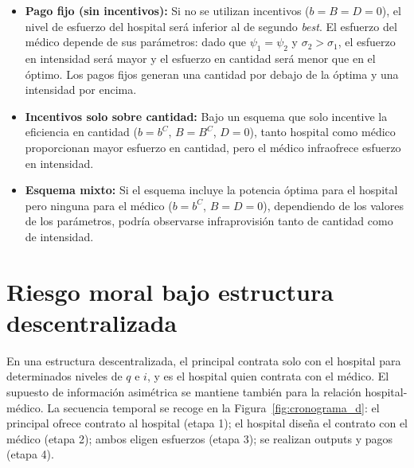 \documentclass[12pt, a4paper, twoside, openright]{book}
\theoremstyle{plain}
\theoremstyle{definition}
\theoremstyle{remark}
\begin{document}
\begin{itemize}
  \item \textbf{Pago fijo (sin incentivos):} Si no se utilizan incentivos ($b=B=D=0$), el nivel de esfuerzo del hospital será inferior al de segundo \textit{best}. El esfuerzo del médico depende de sus parámetros: dado que $\psi_1=\psi_2$ y $\sigma_2>\sigma_1$, el esfuerzo en intensidad será mayor y el esfuerzo en cantidad será menor que en el óptimo. Los pagos fijos generan una cantidad por debajo de la óptima y una intensidad por encima.

  \item \textbf{Incentivos solo sobre cantidad:} Bajo un esquema que solo incentive la eficiencia en cantidad ($b=b^C$, $B=B^C$, $D=0$), tanto hospital como médico proporcionan mayor esfuerzo en cantidad, pero el médico infraofrece esfuerzo en intensidad.

  \item \textbf{Esquema mixto:} Si el esquema incluye la potencia óptima para el hospital pero ninguna para el médico ($b=b^C$, $B=D=0$), dependiendo de los valores de los parámetros, podría observarse infraprovisión tanto de cantidad como de intensidad.
\end{itemize}


\section{Riesgo moral bajo estructura descentralizada}
\label{sec:descentralizada}

En una estructura descentralizada, el principal contrata solo con el hospital para determinados niveles de $q$ e $i$, y es el hospital quien contrata con el médico. El supuesto de información asimétrica se mantiene también para la relación hospital-médico. La secuencia temporal se recoge en la Figura~\ref{fig:cronograma_d}: el principal ofrece contrato al hospital (etapa 1); el hospital diseña el contrato con el médico (etapa 2); ambos eligen esfuerzos (etapa 3); se realizan outputs y pagos (etapa 4).
\end{document}
